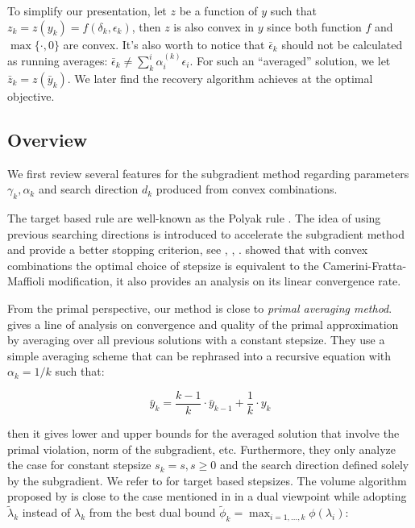 \documentclass[../main]{subfiles}
\begin{document}
To simplify our presentation, let
\(z\) be a function of \(y\) such that \(z_k = z(y_k) = f(\delta_k, \epsilon_k)\), then \(z\) is
also convex in \(y\) since both function \(f\) and \(\max\{\cdot, 0\}\)
are convex. It's also worth to notice that \(\bar \epsilon_k\) should
not be calculated as running averages:
\(\bar \epsilon_k \neq \sum^i_k \alpha_i^{(k)} \epsilon_i\). For such an
``averaged'' solution, we let
\(\bar z_k = z(\bar y_k)\). We later find the recovery algorithm achieves
at the optimal objective.

\subsection{Overview}\label{sec:dual.overview}


We first review several features for the subgradient method regarding
parameters \(\gamma_k, \alpha_k\) and search direction \(d_k\) produced from convex combinations.

The target based rule are well-known as the Polyak rule \cite{polyak_general_1967}.
The idea of using previous searching directions is introduced to accelerate the subgradient method and provide a better stopping criterion,
see \cite{camerini_improving_1975}, \cite{brannlund_generalized_1995}, \cite{barahona_volume_2000}.
\cite{brannlund_generalized_1995} showed that with convex combinations the optimal choice of stepsize is
equivalent to the Camerini-Fratta-Maffioli modification, it also provides an analysis on its linear convergence rate.

From the primal perspective, our method is close to \emph{primal
  averaging method}. \cite{nedic_approximate_2009}
gives a line of analysis on convergence and quality of the primal
approximation by averaging over all previous solutions with a constant
stepsize. They use a simple averaging scheme that can be rephrased into a
recursive equation with \(\alpha_k = 1/k\) such that:

\[\bar y_k = \frac{k-1}{k}\cdot\bar y_{k-1} + \frac{1}{k} \cdot y_k\]

then it gives lower and upper bounds for the averaged solution
that involve the primal violation, norm of the subgradient, etc. Furthermore, they only analyze the case for constant
stepsize \(s_k = s, s\ge 0\) and the search direction defined solely by
the subgradient. We refer to \cite{kiwiel_lagrangian_2007} for target based
stepsizes. The volume algorithm proposed by \cite{barahona_volume_2000} is close to the
case mentioned in \cite{brannlund_generalized_1995} in a dual
viewpoint while adopting \(\tilde \lambda_{k}\) instead of \(\lambda_k\) from the best dual bound
\(\tilde \phi_k = \max_{i=1, ..., k} \phi(\lambda_i)\):
\end{document}
